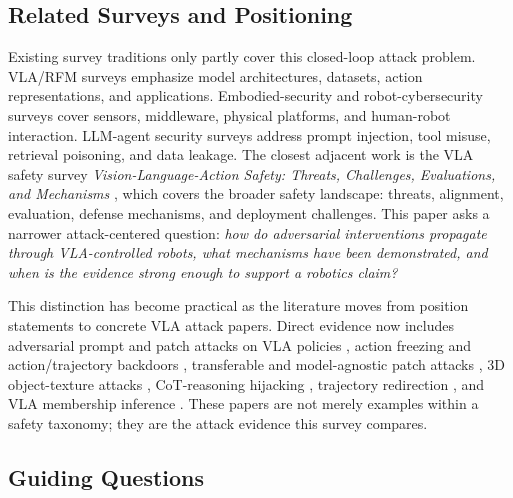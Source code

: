 \subsection{Related Surveys and Positioning}
\label{subsec:positioning}

Existing survey traditions only partly cover this closed-loop attack problem. VLA/RFM surveys emphasize model architectures, datasets, action representations, and applications. Embodied-security and robot-cybersecurity surveys cover sensors, middleware, physical platforms, and human-robot interaction. LLM-agent security surveys address prompt injection, tool misuse, retrieval poisoning, and data leakage. The closest adjacent work is the VLA safety survey \emph{Vision-Language-Action Safety: Threats, Challenges, Evaluations, and Mechanisms} \cite{li2026vlasafety,sermanet2025asimov,zhang2025safevla}, which covers the broader safety landscape: threats, alignment, evaluation, defense mechanisms, and deployment challenges. This paper asks a narrower attack-centered question: \emph{how do adversarial interventions propagate through VLA-controlled robots, what mechanisms have been demonstrated, and when is the evidence strong enough to support a robotics claim?}

This distinction has become practical as the literature moves from position statements to concrete VLA attack papers. Direct evidence now includes adversarial prompt and patch attacks on VLA policies \cite{jones2025robogcg,wang2025vlaadversarial,yan2025vlafool,wu2026saber}, action freezing and action/trajectory backdoors \cite{wang2025freezevla,zhou2025badvla,zhou2025goba,xu2025dropvla,li2025attackvla,xu2026silentdrift}, transferable and model-agnostic patch attacks \cite{xu2025edpa,lu2026patch}, 3D object-texture attacks \cite{chen2026tex3d}, CoT-reasoning hijacking \cite{huang2026trap}, trajectory redirection \cite{puthumanaillam2026trajectory}, and VLA membership inference \cite{peng2026miavla,luan2026vlaleaks}. These papers are not merely examples within a safety taxonomy; they are the attack evidence this survey compares.

\subsection{Guiding Questions}
\label{subsec:rqs}


